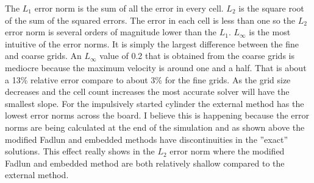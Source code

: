 The $L_1$ error norm is the sum of all the error in every cell. 
$L_2$ is the square root of the sum of the squared errors. 
The error in each cell is less than one so the $L_2$ error norm is several orders of magnitude lower than the $L_1$. 
$L_\infty$ is the most intuitive of the error norms. 
It is simply the largest difference between the fine and coarse grids. 
An $L_\infty$ value of 0.2 that is obtained from the coarse grids is mediocre because the maximum velocity is around one and a half. 
That is about a 13\% relative error compare to about 3\% for the fine grids. 
As the grid size decreases and the cell count increases the most accurate solver will have the smallest slope. 
For the impulsively started cylinder the external method has the lowest error norms across the board. 
I believe this is happening because the error norms are being calculated at the end of the simulation and as shown above the modified Fadlun and embedded methods have discontinuities in the ''exact'' solutions. 
This effect really shows in the $L_2$ error norm where the modified Fadlun and embedded method are both relatively shallow compared to the external method.



